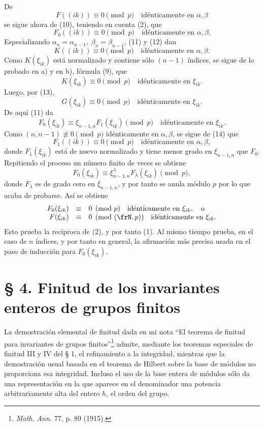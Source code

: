 \documentclass[11pt]{article}
\begin{document}
De
\[
        F((ik))\equiv0\pmod p\quad \text{idénticamente en \(\alpha,\beta\)}
\]
se sigue ahora de (10), teniendo en cuenta (2), que
\begin{equation}
        F_0((ik))\equiv0\pmod p\quad \text{idénticamente en \(\alpha,\beta\)}.
\end{equation}
Especializando \(\alpha_n=\alpha_{n-1},\;\beta_n=\beta_{n-1}\), (11) y (12) dan
\begin{equation}
        K((ik))\equiv0\pmod p\quad \text{idénticamente en \(\alpha,\beta\)}.
\end{equation}
Como \(K(\xi_{ik})\) está normalizado y contiene sólo \((n-1)\) índices, se sigue de lo probado en a) y en b), fórmula (9), que
\[
        K(\xi_{ik})\equiv0\pmod p\quad \text{idénticamente en \(\xi_{ik}\)}.
\]
Luego, por (13),
\[
        G(\xi_{ik})\equiv0\pmod p\quad \text{idénticamente en \(\xi_{ik}\)}.
\]
De aquí (11) da
\[
        F_0(\xi_{ik})\equiv \xi_{n-1,n}F_1(\xi_{ik})\pmod p
        \quad \text{idénticamente en \(\xi_{ik}\)}.
\]
Como \((n,n-1)\not\equiv0\pmod p\) idénticamente en \(\alpha,\beta\), se sigue de (14) que
\[
        F_1((ik))\equiv0\pmod p\quad \text{idénticamente en \(\alpha,\beta\)},
\]
donde \(F_1(\xi_{ik})\) está de nuevo normalizado y tiene menor grado en \(\xi_{n-1,n}\) que \(F_0\). Repitiendo el proceso un número finito de veces se obtiene
\[
        F_0(\xi_{ik})\equiv\xi_{n-1,n}^{\lambda}F_\lambda(\xi_{ik})\pmod p,
\]
donde \(F_\lambda\) es de grado cero en \(\xi_{n-1,n}\), y por tanto se anula módulo \(p\) por lo que acaba de probarse. Así se obtiene
\begin{equation}
\begin{array}{rcl}
        F_0(\xi_{ik})&\equiv&0\pmod p\quad \text{idénticamente en \(\xi_{ik}\)},\quad\text{o}\\
        F(\xi_{ik})&\equiv&0\pmod{(\frN,p)}\quad \text{idénticamente en \(\xi_{ik}\)}.
\end{array}
\end{equation}
Esto prueba la recíproca de (2), y por tanto (1). Al mismo tiempo prueba, en el caso de \(n\) índices, y por tanto en general, la afirmación más precisa usada en el paso de inducción para \(F_0(\xi_{ik})\).

\setcounter{equation}{0}
\section*{§ 4. Finitud de los invariantes enteros de grupos finitos}

La demostración elemental de finitud dada en mi nota ``El teorema de finitud para invariantes de grupos finitos''\footnote{\emph{Math. Ann.} 77, p. 89 (1915).} admite, mediante los teoremas especiales de finitud III y IV del § 1, el refinamiento a la integridad, mientras que la demostración usual basada en el teorema de Hilbert sobre la base de módulos no proporciona esa integridad. Incluso el uso de la base entera de módulos sólo da una representación en la que aparece en el denominador una potencia arbitrariamente alta del entero \(h\), el orden del grupo.
\end{document}
